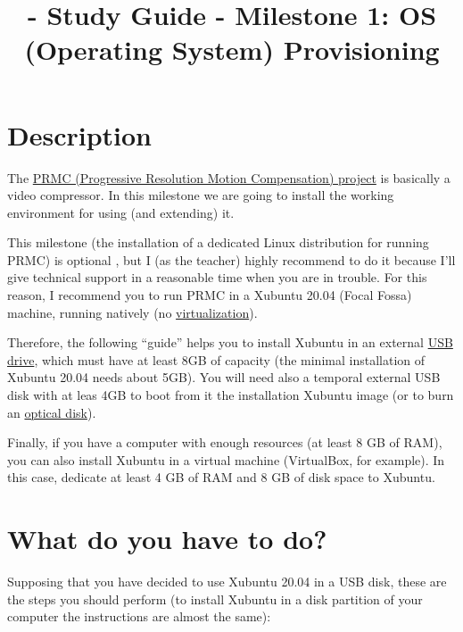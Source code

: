 
\title{\SM - Study Guide - Milestone 1: OS (Operating System) Provisioning}

\maketitle

\tableofcontents

\section{Description}

The \href{https://github.com/Sistemas-Multimedia/PRMC/}{PRMC
  (Progressive Resolution Motion Compensation) project} is basically a
video compressor. In this milestone we are going to install the
working environment for using (and extending) it.

This milestone (the installation of a dedicated Linux distribution for
running PRMC) is optional , but I (as the teacher) highly
recommend to do it because I'll give technical support in a reasonable
time when you are in trouble. For this reason, I recommend you to run
PRMC in a Xubuntu 20.04 (Focal Fossa) \cite{xubuntu} machine,
running natively
(no \href{https://en.wikipedia.org/wiki/Virtualization}{virtualization}).

Therefore, the following ``guide'' helps you to install Xubuntu in an
external \href{https://en.wikipedia.org/wiki/USB_flash_drive}{USB
drive}, which must have at least 8GB of capacity (the minimal
installation of Xubuntu 20.04 needs about 5GB). You will need also a
temporal external USB disk with at leas 4GB to boot from it the
installation Xubuntu image (or to burn
an \href{https://en.wikipedia.org/wiki/Optical_disc}{optical disk}).

Finally, if you have a computer with enough resources (at least 8 GB
of RAM), you can also install Xubuntu in a virtual machine
(VirtualBox, for example). In this case, dedicate at least 4 GB of RAM
and 8 GB of disk space to Xubuntu.

\section{What do you have to do?}

Supposing that you have decided to use Xubuntu 20.04 in a USB disk,
these are the steps you should perform (to install Xubuntu in a disk
partition of your computer the instructions are almost the same):

